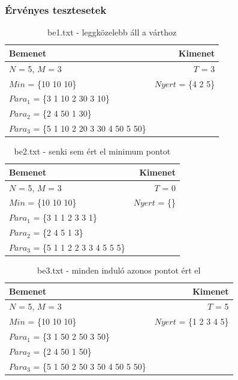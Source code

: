 \documentclass[a4paper]{article}
\begin{document}
      \subsubsection{Érvényes tesztesetek}
      \begin{table}[H]
        \caption*{be1.txt - leggközelebb áll a várthoz}
        \begin{tabular*}{\textwidth}{lr}
          \toprule
          Bemenet & Kimenet \\
          \midrule
          $N$ = 5, $M$ = 3 & $T$ = 3 \\
          $Min$ = \{10 10 10\} & $Nyert$ = \{4 2 5\} \\
          $Para_1$ = \{3 1 10 2 30 3 10\} \\
          $Para_2$ = \{2 4 50 1 30\} \\
          $Para_3$ = \{5 1 10 2 20 3 30 4 50 5 50\} \\
          \bottomrule
        \end{tabular*}
      \end{table}
      \begin{table}[H]
        \caption*{be2.txt - senki sem ért el minimum pontot}
        \begin{tabular*}{\textwidth}{lr}
          \toprule
          Bemenet & Kimenet \\
          \midrule
          $N$ = 5, $M$ = 3 & $T$ = 0 \\
          $Min$ = \{10 10 10\} & $Nyert$ = \{\} \\
          $Para_1$ = \{3 1 1 2 3 3 1\} \\
          $Para_2$ = \{2 4 5 1 3\} \\
          $Para_3$ = \{5 1 1 2 2 3 3 4 5 5 5\} \\
          \bottomrule
        \end{tabular*}
      \end{table}
      \begin{table}[H]
        \caption*{be3.txt - minden induló azonos pontot ért el}
        \begin{tabular*}{\textwidth}{lr}
          \toprule
          Bemenet & Kimenet \\
          \midrule
          $N$ = 5, $M$ = 3 & $T$ = 5 \\
          $Min$ = \{10 10 10\} & $Nyert$ = \{1 2 3 4 5\} \\
          $Para_1$ = \{3 1 50 2 50 3 50\} \\
          $Para_2$ = \{2 4 50 1 50\} \\
          $Para_3$ = \{5 1 50 2 50 3 50 4 50 5 50\} \\
          \bottomrule
        \end{tabular*}
      \end{table}
\end{document}
